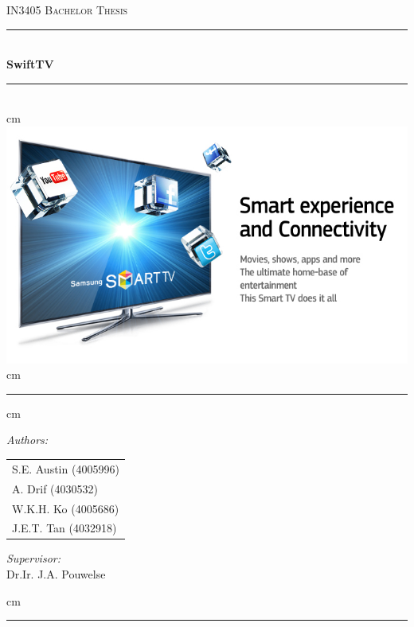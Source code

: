 \documentclass[a4paper]{report}
\begin{document}
\begin{titlepage}
			\begin{center}
			\textsc{\LARGE {IN3405 Bachelor Thesis}}\\[1cm]
			\rule{\linewidth}{0.5mm} \\[0.4cm]

			{\Huge \bfseries SwiftTV}\\[0.15cm]

			\rule{\linewidth}{0.5mm} \\[1.5cm]
			
			 cm
			\includegraphics[scale=0.5]{Images/title.jpg}
			 cm
				\rule{\linewidth}{0.5mm}
			
			 cm
			
			\begin{minipage}{0.4\textwidth}
				\begin{flushleft} \large
					\emph{Authors:}\\
					\begin{tabular}{l}
						S.E. Austin (4005996) \\
						A. Drif (4030532) \\
						W.K.H. Ko (4005686) \\
						J.E.T. Tan (4032918)
					\end{tabular}
				\end{flushleft}
			\end{minipage}
			\hspace{1cm}
			\begin{minipage}{0.4\textwidth}
				\begin{flushright} \large
					\emph{Supervisor:} \\
					Dr.Ir. J.A. Pouwelse
				\end{flushright}
			\end{minipage}
			
			 cm
			
			\rule{\linewidth}{0.5mm}
			\end{center}
\end{titlepage}



\tableofcontents













\printbibliography
\end{document}
